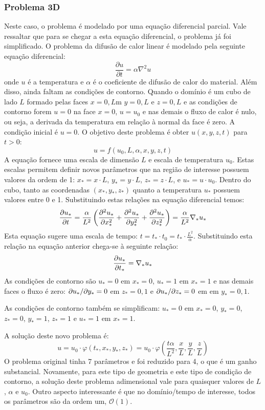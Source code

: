\subsubsection{Problema 3D}
Neste caso, o problema é modelado por uma equação diferencial parcial. Vale ressaltar que para se chegar a esta equação diferencial, o problema já foi simplificado. O problema da difusão de calor linear é modelado pela seguinte equação diferencial:
\[
\frac{\partial u}{\partial t} = \alpha\nabla^2 u
\]
onde $u$ é a temperatura e $\alpha$ é o coeficiente de difusão de calor do material. Além disso, ainda faltam as condições de contorno. Quando o domínio é um cubo de lado $L$ formado pelas faces $x=0,L$m $y=0,L$ e $z=0,L$ e as condições de contorno forem $u=0$ na face $x=0$, $u=u_0$ e nas demais o fluxo de calor é nulo, ou seja, a derivada da temperatura em relação à normal da face é zero. A condição inicial é $u=0$. O objetivo deste problema é obter $u(x,y,z,t)$ para $t>0$:
\[
u = f(u_0, L, \alpha, x, y, z, t)
\]
A equação fornece uma escala de dimensão $L$ e escala de temperatura $u_0$. Estas escalas permitem definir novos parâmetros que na região de interesse possuem valores da ordem de 1: $x_* = x\cdot L$, $y_* = y\cdot L$, $z_* = z\cdot L$, e $u_* = u\cdot u_0$. Dentro do cubo, tanto as coordenadas $(x_*, y_*, z_*)$ quanto a temperatura $u_*$  possuem valores entre 0 e 1. Substituindo estas relações na equação diferencial temos:
\[
\frac{\partial u_*}{\partial t} = \frac{\alpha}{L^2}\left(\frac{\partial^2 u_*}{\partial x_*^2} + \frac{\partial^2 u_*}{\partial y_*^2} + \frac{\partial^2 u_*}{\partial z_*^2} \right) = \frac{\alpha}{L^2} \nabla_* u_*
\]
Esta equação sugere uma escala de tempo: $t = t_*\cdot t_0 = t_* \cdot \frac{L^2}{\alpha}$. Substituindo esta relação na equação anterior chega-se à seguinte relação:
\[
\frac{\partial u_*}{\partial t_*} =\nabla_* u_*
\]
As condições de contorno são $u_*=0$ em $x_*=0$, $u_*=1$ em $x_*=1$ e nas demais faces o fluxo é zero: $\partial u_*/\partial y_* = 0$ em $z_*=0,1$ e $\partial u_*/\partial z_* = 0$ em em $y_*=0,1$.


As condições de contorno também se simplificam: $u_*=0$ em $x_*=0$, $y_*=0$, $z_*=0$, $y_*=1$, $z_*=1$ e $u_* = 1$ em $x_* = 1$. 

A solução deste novo problema é:
\[
u = u_0 \cdot \varphi(t_*, x_*, y_*, z_*) = u_0\cdot\varphi\left(\frac{t\alpha}{L^2}, \frac{x}{L}, 
 \frac{y}{L} , \frac{z}{L}\right)
\]
O problema original tinha 7 parâmetros e foi reduzido para 4, o que é um ganho substancial. Novamente, para este tipo de geometria e este tipo de condição de contorno, a solução deste problema adimensional vale para quaisquer valores de $L$, $\alpha$ e $u_0$. Outro aspecto interessante é que no domínio/tempo de interesse, todos os parâmetros são da ordem um, $\mathcal{O}(1)$.

